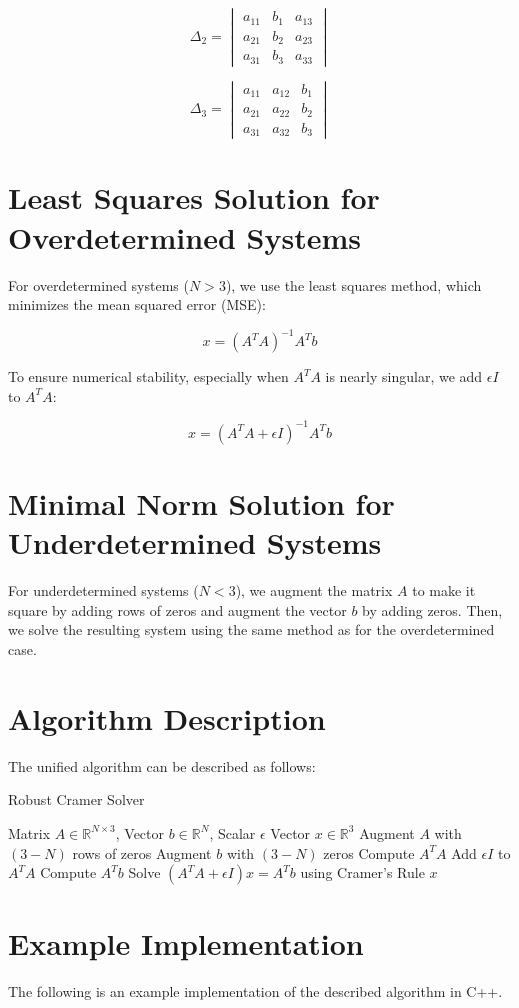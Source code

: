 \documentclass{article}
\begin{document}
\[
\Delta_2 = \begin{vmatrix}
a_{11} & b_1 & a_{13} \\
a_{21} & b_2 & a_{23} \\
a_{31} & b_3 & a_{33}
\end{vmatrix}
\]

\[
\Delta_3 = \begin{vmatrix}
a_{11} & a_{12} & b_1 \\
a_{21} & a_{22} & b_2 \\
a_{31} & a_{32} & b_3
\end{vmatrix}
\]

\section{Least Squares Solution for Overdetermined Systems}
For overdetermined systems (\(N > 3\)), we use the least squares method, which minimizes the mean squared error (MSE):

\[
x = (A^T A)^{-1} A^T b
\]

To ensure numerical stability, especially when \(A^T A\) is nearly singular, we add \(\epsilon I\) to \(A^T A\):

\[
x = (A^T A + \epsilon I)^{-1} A^T b
\]

\section{Minimal Norm Solution for Underdetermined Systems}
For underdetermined systems (\(N < 3\)), we augment the matrix \(A\) to make it square by adding rows of zeros and augment the vector \(b\) by adding zeros. Then, we solve the resulting system using the same method as for the overdetermined case.

\section{Algorithm Description}
The unified algorithm can be described as follows:

\begin{algorithm}[H]
\caption{Robust Cramer Solver}
\begin{algorithmic}[1]
\REQUIRE Matrix $A \in \mathbb{R}^{N \times 3}$, Vector $b \in \mathbb{R}^{N}$, Scalar $\epsilon$
\ENSURE Vector $x \in \mathbb{R}^{3}$
    \STATE Augment $A$ with $(3-N)$ rows of zeros
    \STATE Augment $b$ with $(3-N)$ zeros
\ENDIF
\STATE Compute $A^T A$
\STATE Add $\epsilon I$ to $A^T A$
\STATE Compute $A^T b$
\STATE Solve $(A^T A + \epsilon I)x = A^T b$ using Cramer's Rule
\RETURN $x$
\end{algorithmic}
\end{algorithm}

\section{Example Implementation}
The following is an example implementation of the described algorithm in C++.
\end{document}
